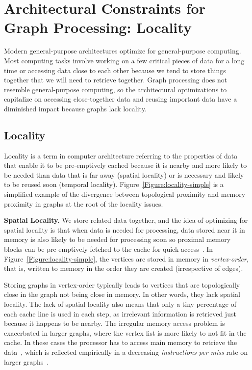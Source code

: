 \section{Architectural Constraints for Graph Processing: Locality}
\label{section:26-system-preliminaries}
Modern general-purpose architectures optimize for general-purpose computing. 
Most computing tasks involve working on a few critical pieces of data for a long time or accessing data close to each other because we tend to store things together that we will need to retrieve together. 
Graph processing does not resemble general-purpose computing, so the architectural optimizations to capitalize on accessing close-together data and reusing important data have a diminished impact because graphs lack locality.

\subsection{Locality}
Locality is a term in computer architecture referring to the properties of data that enable it to be pre-emptively cached because it is nearby and more likely to be needed than data that is far away (spatial locality) or is necessary and likely to be reused soon (temporal locality).
Figure~\ref{Figure:locality-simple} is a simplified example of the divergence between topological proximity and memory proximity in graphs at the root of the locality issues.

\textbf{Spatial Locality.}
We store related data together, and the idea of optimizing for spatial locality is that when data is needed for processing, data stored near it in memory is also likely to be needed for processing soon so proximal memory blocks can be pre-emptively fetched to the cache for quick access~\cite{Hennessy2019}.
In Figure~\ref{Figure:locality-simple}, the vertices are stored in memory in \textit{vertex-order}, that is, written to memory in the order they are created (irrespective of edges).

Storing graphs in vertex-order typically leads to vertices that are topologically close in the graph not being close in memory. 
In other words, they lack spatial locality.
The lack of spatial locality also means that only a tiny percentage of each cache line is used in each step, as irrelevant information is retrieved just because it happens to be nearby.
The irregular memory access problem is exacerbated in larger graphs, where the vertex list is more likely to not fit in the cache. 
In these cases the processor has to access main memory to retrieve the data~\cite{Chung2012}, which is reflected empirically in a decreasing \textit{instructions per miss} rate on larger graphs~\cite{Beamer2015}.

